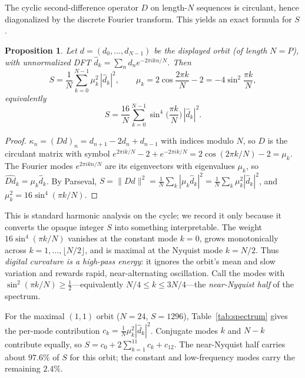\documentclass[12pt]{article}
\newtheorem{prop}{Proposition}
\theoremstyle{remark}
\begin{document}
The cyclic second-difference operator $D$ on length-$N$ sequences is circulant, hence
diagonalized by the discrete Fourier transform. This yields an exact formula for $S$.

\begin{prop}\label{prop:spectral}
Let $d=(d_0,\dots,d_{N-1})$ be the displayed orbit (of length $N=P$), with unnormalized DFT
$\hat d_k=\sum_{n}d_n e^{-2\pi i kn/N}$. Then
\[
S=\frac1N\sum_{k=0}^{N-1}\mu_k^2\,|\hat d_k|^2,
\qquad
\mu_k=2\cos\!\frac{2\pi k}{N}-2=-4\sin^2\!\frac{\pi k}{N},
\]
equivalently
\[
\boxed{\;S=\frac{16}{N}\sum_{k=0}^{N-1}\sin^4\!\Big(\frac{\pi k}{N}\Big)\,|\hat d_k|^2.\;}
\]
\end{prop}

\begin{proof}
$\kappa_n=(Dd)_n=d_{n+1}-2d_n+d_{n-1}$ with indices modulo $N$, so $D$ is the circulant
matrix with symbol $e^{2\pi i k/N}-2+e^{-2\pi i k/N}=2\cos(2\pi k/N)-2=\mu_k$. The Fourier
modes $e^{2\pi i kn/N}$ are its eigenvectors with eigenvalues $\mu_k$, so
$\widehat{Dd}_k=\mu_k\hat d_k$. By Parseval, $S=\lVert Dd\rVert^2=\frac1N\sum_k|\mu_k\hat
d_k|^2=\frac1N\sum_k\mu_k^2|\hat d_k|^2$, and $\mu_k^2=16\sin^4(\pi k/N)$.
\end{proof}

This is standard harmonic analysis on the cycle; we record it only because it converts the
opaque integer $S$ into something interpretable. The weight $16\sin^4(\pi k/N)$ vanishes at
the constant mode $k=0$, grows monotonically across $k=1,\dots,\lfloor N/2\rfloor$, and is
maximal at the Nyquist mode $k=N/2$. Thus \emph{digital curvature is a high-pass energy}:
it ignores the orbit's mean and slow variation and rewards rapid, near-alternating
oscillation. Call the modes with $\sin^2(\pi k/N)\ge\frac12$---equivalently
$N/4\le k\le 3N/4$---the \emph{near-Nyquist half} of the spectrum.

For the maximal $(1,1)$ orbit ($N=24$, $S=1296$), Table~\ref{tab:spectrum} gives the
per-mode contribution $c_k=\frac1N\mu_k^2|\hat d_k|^2$. Conjugate modes $k$ and $N-k$
contribute equally, so $S=c_0+2\sum_{k=1}^{11}c_k+c_{12}$. The near-Nyquist half carries
about $97.6\%$ of $S$ for this orbit; the constant and low-frequency modes carry the
remaining $2.4\%$.
\end{document}
